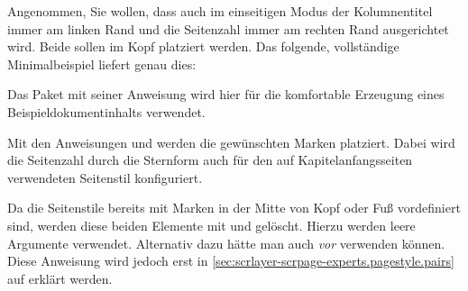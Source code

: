     \begin{Example}
      Angenommen, Sie wollen, dass auch im einseitigen Modus der Kolumnentitel
      immer am linken Rand und die Seitenzahl immer am rechten Rand
      ausgerichtet wird. Beide sollen im Kopf platziert werden. Das folgende,
      vollständige Minimalbeispiel liefert genau dies:
      Das Paket  mit seiner
      Anweisung  wird hier für
      die komfortable Erzeugung eines Beispieldokumentinhalts verwendet.

      Mit den Anweisungen 
      und  werden die
      gewünschten Marken platziert. Dabei wird die
      Seitenzahl\iffalse-Marke\fi{} durch die Sternform
      \iffalse%
      nicht nur auf den mit
      \DescRef{\LabelBase.pagestyle.scrheadings}\IndexPagestyle{scrheadings}
      gesetzten Seiten, sondern auch für den auf Kapitelanfangsseiten
      automatisch verwendeten \PageStyle{plain}-Seitenstil %
      \else%
      auch für den auf Kapitelanfangsseiten verwendeten Seitenstil %
      \fi%
       konfiguriert.%

      Da die Seitenstile bereits mit Marken in der Mitte von Kopf oder
      Fuß vordefiniert sind, werden diese beiden Elemente mit
       und
       gelöscht. Hierzu werden leere
      Argumente verwendet. Alternativ dazu hätte man auch
      \emph{vor}  verwenden können. Diese
      Anweisung wird jedoch erst in
      \autoref{sec:scrlayer-scrpage-experts.pagestyle.pairs} auf
      erklärt werden.
    \end{Example}%


